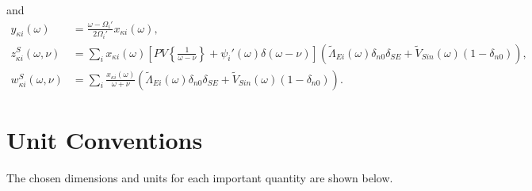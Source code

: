 \documentclass{article}
\begin{document}
and
\begin{equation}
\begin{split}
y_{\kappa i}(\omega) &= \frac{\omega - \Omega_i'}{2\Omega_i'}x_{\kappa i}(\omega),\\
z_{\kappa i}^S(\omega,\nu) &= \sum_{i}x_{\kappa i}(\omega)\left[PV\left\{\frac{1}{\omega - \nu}\right\} + \psi_i'(\omega)\delta(\omega - \nu)\right]\left(\tilde{\Lambda}_{Ei}(\omega)\delta_{n0}\delta_{SE} + \tilde{V}_{Sin}(\omega)(1 - \delta_{n0})\right),\\
w_{\kappa i}^S(\omega,\nu) &= \sum_i\frac{x_{\kappa i}(\omega)}{\omega + \nu}\left(\tilde{\Lambda}_{Ei}(\omega)\delta_{n0}\delta_{SE} + \tilde{V}_{Sin}(\omega)(1 - \delta_{n0})\right).
\end{split}
\end{equation}





 






















\newpage
% 



























\newpage
\appendix
{}

\section{Unit Conventions}\label{app:unitConventions}

The chosen dimensions and units for each important quantity are shown below.
\end{document}
